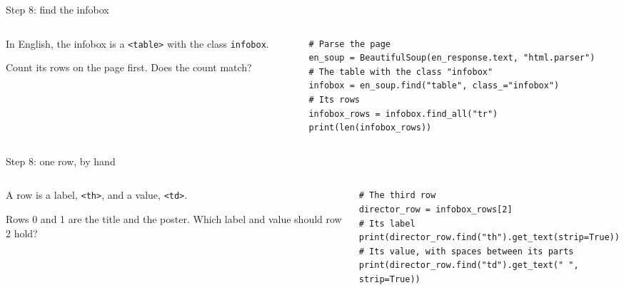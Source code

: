 \documentclass[9pt,aspectratio=169]{beamer}
\begin{document}
\begin{frame}[fragile]{Step 8: find the infobox}
    \begin{columns}[T]
        \begin{column}{0.37\textwidth}
            In English, the infobox is a \texttt{<table>} with the class \texttt{infobox}.

            \medskip
            Count its rows on the page first. Does the count match?
        \end{column}
        \begin{column}{0.6\textwidth}
\begin{lstlisting}
# Parse the page
en_soup = BeautifulSoup(en_response.text, "html.parser")
# The table with the class "infobox"
infobox = en_soup.find("table", class_="infobox")
# Its rows
infobox_rows = infobox.find_all("tr")
print(len(infobox_rows))
\end{lstlisting}
        \end{column}
    \end{columns}
\end{frame}

\begin{frame}[fragile]{Step 8: one row, by hand}
    \begin{columns}[T]
        \begin{column}{0.37\textwidth}
            A row is a label, \texttt{<th>}, and a value, \texttt{<td>}.

            \medskip
            Rows 0 and 1 are the title and the poster. Which label and value should row 2 hold?
        \end{column}
        \begin{column}{0.6\textwidth}
\begin{lstlisting}
# The third row
director_row = infobox_rows[2]
# Its label
print(director_row.find("th").get_text(strip=True))
# Its value, with spaces between its parts
print(director_row.find("td").get_text(" ", strip=True))
\end{lstlisting}
        \end{column}
    \end{columns}
\end{frame}
\end{document}
